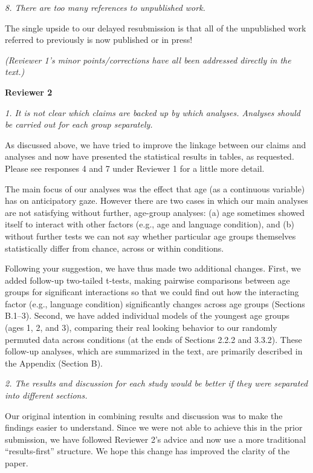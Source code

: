 \documentclass[11pt,a4paper]{letter} %
\begin{document}
\begin{letter}{}
\smallskip

\noindent \textit{8. There are too many references to unpublished work.}

\noindent The single upside to our delayed resubmission is that all of the unpublished work referred to previously is now published or in press!

\smallskip

\noindent \textit{(Reviewer 1's minor points/corrections have all been addressed directly in the text.)}

\bigskip

\noindent \textbf{Reviewer 2}

\noindent \textit{1. It is not clear which claims are backed up by which analyses. Analyses should be carried out for each group separately.}

\noindent As discussed above, we have tried to improve the linkage between our claims and analyses and now have presented the statistical results in tables, as requested. Please see responses 4 and 7 under Reviewer 1 for a little more detail. 

The main focus of our analyses was the effect that age (as a continuous variable) has on anticipatory gaze. However there are two cases in which our main analyses are not satisfying without further, age-group analyses: (a) age sometimes showed itself to interact with other factors (e.g., age and language condition), and (b) without further tests we can not say whether particular age groups themselves statistically differ from chance, across or within conditions. 

Following your suggestion, we have thus made two additional changes. First, we added follow-up two-tailed t-tests, making pairwise comparisons between age groups for significant interactions so that we could find out how the interacting factor (e.g., language condition) significantly changes across age groups (Sections B.1--3). Second, we have added individual models of the youngest age groups (ages 1, 2, and 3), comparing their real looking behavior to our randomly permuted data across conditions (at the ends of Sections 2.2.2 and 3.3.2). These follow-up analyses, which are summarized in the text, are primarily described in the Appendix (Section B).

\smallskip

\noindent \textit{2. The results and discussion for each study would be better if they were separated into different sections.}

\noindent Our original intention in combining results and discussion was to make the findings easier to understand. Since we were not able to achieve this in the prior submission, we have followed Reviewer 2's advice and now use a more traditional ``results-first'' structure. We hope this change has improved the clarity of the paper. 


\end{letter}
\end{document}
